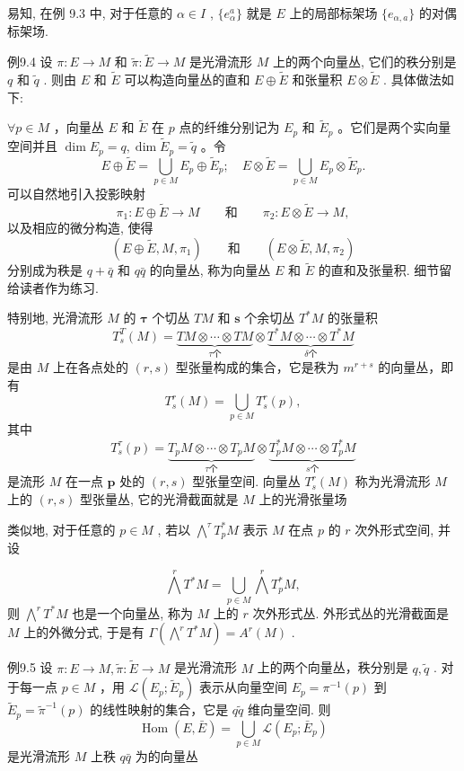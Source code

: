 易知, 在例 9.3 中, 对于任意的  $\alpha \in I$ ,  $\{e_{\alpha}^{a}\}$  就是  $E$  上的局部标架场  $\{e_{\alpha, a}\}$  的对偶标架场.

例9.4 设  $\pi : E \to M$  和  $\tilde{\pi} : \tilde{E} \to M$  是光滑流形  $M$  上的两个向量丛, 它们的秩分别是  $q$  和  $\tilde{q}$ . 则由  $E$  和  $\tilde{E}$  可以构造向量丛的直和  $E \oplus \tilde{E}$  和张量积  $E \otimes \tilde{E}$ . 具体做法如下:

$\forall p \in M$ ，向量丛  $E$  和  $\tilde{E}$  在  $p$  点的纤维分别记为  $E_p$  和  $\tilde{E}_p$ 。它们是两个实向量空间并且  $\dim E_p = q, \dim \tilde{E}_p = \tilde{q}$ 。令
$$
E \oplus \tilde {E} = \bigcup_ {p \in M} E _ {p} \oplus \tilde {E} _ {p}; \quad E \otimes \tilde {E} = \bigcup_ {p \in M} E _ {p} \otimes \tilde {E} _ {p}.
$$
可以自然地引入投影映射
$$
\pi_ {1}: E \oplus \tilde {E} \to M \qquad {\text {和}} \qquad \pi_ {2}: E \otimes \tilde {E} \to M,
$$
以及相应的微分构造, 使得
$$
(E \oplus \tilde {E}, M, \pi_ {1}) \qquad {\text {和}} \qquad (E \otimes \tilde {E}, M, \pi_ {2})
$$
分别成为秩是  $q + \bar{q}$  和  $q\bar{q}$  的向量丛, 称为向量丛  $E$  和  $\tilde{E}$  的直和及张量积. 细节留给读者作为练习.

特别地, 光滑流形  $M$  的  $\pmb{\tau}$  个切丛  $TM$  和  $\boldsymbol{s}$  个余切丛  $T^{*}M$  的张量积
$$
T _ {s} ^ {T} (M) = \underbrace {T M \otimes \cdots \otimes T M} _ {\tau \text {个}} \otimes \underbrace {T ^ {*} M \otimes \cdots \otimes T ^ {*} M} _ {\delta \text {个}}
$$
是由  $M$  上在各点处的  $(r,s)$  型张量构成的集合，它是秩为  $m^{r + s}$  的向量丛，即有
$$
T _ {s} ^ {r} (M) = \bigcup_ {p \in M} T _ {s} ^ {r} (p),
$$
其中
$$
T _ {s} ^ {\tau} (p) = \underbrace {T _ {p} M \otimes \cdots \otimes T _ {p} M} _ {\tau \text {个}} \otimes \underbrace {T _ {p} ^ {*} M \otimes \cdots \otimes T _ {p} ^ {*} M} _ {s \text {个}}
$$
是流形  $M$  在一点  $\pmb{p}$  处的  $(r,s)$  型张量空间. 向量丛  $T_{s}^{r}(M)$  称为光滑流形  $M$  上的  $(r,s)$  型张量丛, 它的光滑截面就是  $M$  上的光滑张量场

类似地, 对于任意的  $p \in M$ , 若以  $\bigwedge^{\tau} T_{p}^{*} M$  表示  $M$  在点  $p$  的  $r$  次外形式空间, 并设

$$
\bigwedge^ {r} T ^ {*} M = \bigcup_ {p \in M} \bigwedge^ {r} T _ {p} ^ {*} M,
$$
则  $\bigwedge^r T^* M$  也是一个向量丛, 称为  $M$  上的  $r$  次外形式丛. 外形式丛的光滑截面是  $M$  上的外微分式, 于是有  $\Gamma (\bigwedge^{r}T^{*}M) = A^{r}(M)$ .

例9.5 设  $\pi : E \to M, \tilde{\pi} : \tilde{E} \to M$  是光滑流形  $M$  上的两个向量丛，秩分别是  $q, \tilde{q}$ . 对于每一点  $p \in M$ ，用  $\mathcal{L}(E_p; \tilde{E}_p)$  表示从向量空间  $E_p = \pi^{-1}(p)$  到  $\tilde{E}_p = \tilde{\pi}^{-1}(p)$  的线性映射的集合，它是  $q\tilde{q}$  维向量空间. 则
$$
\operatorname {H o m} (E, \bar {E}) = \bigcup_ {p \in M} \mathscr {L} \left(E _ {p}; \bar {E} _ {p}\right)
$$
是光滑流形  $M$  上秩  $q\bar{q}$  为的向量丛

